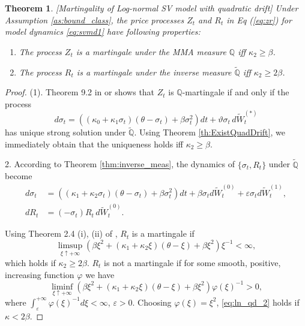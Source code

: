 \documentclass[pdftex,11pt,a4paper] {article}
\newtheorem{theorem}{Theorem}[section]
\begin{document}
\begin{theorem}\label{thm::bounds_LN_model_quad_drift}[Martingality of Log-normal SV model with quadratic drift]
Under Assumption \ref{as:bound_class}, the price processes $Z_{t}$ and $R_{t}$ in Eq (\ref{eq:zr}) for model dynamics \eqref{eq:svmd1} have following properties:
\begin{enumerate}%
\item The process $Z_t$ is a martingale under the MMA measure $\mathbb{Q}$ iff $\kappa_2\ge \beta$.

\item\label{item::inverse_matringale} The process $R_t$ is a martingale under the inverse measure $\tilde{\mathbb{Q}}$ iff $\kappa_2\ge 2\beta$.
\end{enumerate}
\end{theorem}
%
\begin{proof}

(1). Theorem 9.2 in \cite{Lewis2000} or \cite{Sin1998} shows that $Z_t$ is $\mathbb{Q}$-martingale if and only if the process
\begin{equation*}
d\sigma_t=((\kappa_0+\kappa_1\sigma_t)(\theta-\sigma_t)+\beta \sigma_t^2)dt + \vartheta \sigma_t\,d\widetilde W^{(*)}_{t}
\end{equation*}
has unique strong solution under $\tilde{\mathbb{Q}}$. Using Theorem \ref{th:ExistQuadDrift}, we immediately obtain that the uniqueness holds iff  $\kappa_2\ge \beta$. 


2. According to Theorem \ref{thm:inverse_meas}, the dynamics of $\{\sigma_t, R_t\}$ under $\tilde{\mathbb{Q}}$ become
\begin{equation}\label{eq:ln_qd_1}
\begin{split}
d\sigma_{t}& =\left((\kappa_{1}+\kappa_2\sigma_t)(\theta-\sigma_t)+\beta\sigma_t^2\right)dt+  \beta  \sigma_{t}d\widetilde W^{(0)}_{t} +  \varepsilon \sigma_{t} d\widetilde W^{(1)}_{t},\\
dR_t&=(-\sigma_t)R_t\,d\widetilde W_t^{(0)}.
\end{split}
\end{equation}

Using Theorem 2.4 (i), (ii) of \cite{Lions2007}, $R_t$ is a martingale if
\begin{equation*}
\limsup_{\xi\uparrow +\infty}\left(\beta\xi^2+(\kappa_1+\kappa_2\xi)(\theta-\xi)+\beta\xi^2\right)\xi^{-1}<\infty,
\end{equation*}
which holds if $\kappa_2\ge 2\beta$. $R_t$ is not a martingale if for some smooth, positive, increasing function $\varphi$ we have
\begin{equation}\label{eq:ln_qd_2}
\liminf_{\xi\uparrow +\infty}\left(\beta\xi^2+(\kappa_1+\kappa_2\xi)(\theta-\xi)+\beta\xi^2\right)\varphi(\xi)^{-1}>0,
\end{equation}
where $\int_\varepsilon^{+\infty}\varphi(\xi)^{-1}d\xi<\infty$, $\varepsilon>0$.
Choosing $\varphi(\xi)=\xi^2$, \eqref{eq:ln_qd_2} holds if $\kappa<2\beta$.
\end{proof}
\end{document}
